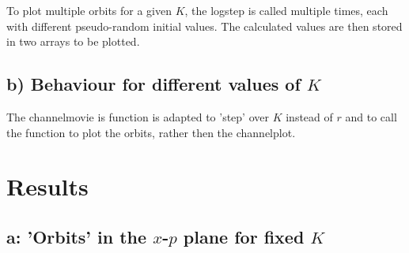 \documentclass{article}
\begin{document}
To plot multiple orbits for a given $K$, the logstep is called multiple times, each with different pseudo-random initial values. The calculated values are then stored in two arrays to be plotted.

\subsection*{b) Behaviour for different values of $K$}
The channelmovie is function is adapted to 'step' over $K$ instead of $r$ and to call the function to plot the orbits, rather then the channelplot.

\section{Results}

\subsection*{a: 'Orbits' in the $x$-$p$ plane for fixed $K$}
\end{document}

